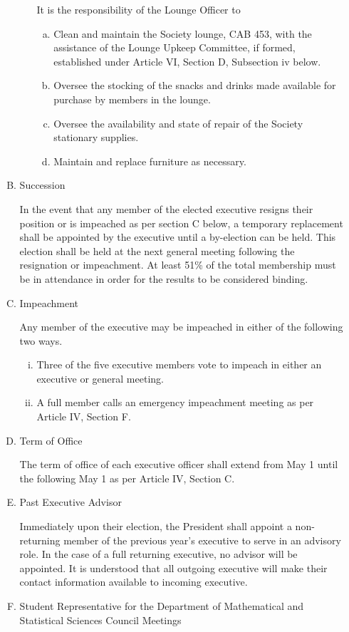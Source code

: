 \documentclass[11pt]{article}
\begin{document}
\begin{enumerate}[I.]
\begin{enumerate}[A)]
\begin{enumerate}[i)]
					It is the responsibility of the Lounge Officer to
						\begin{enumerate}[a)]
							\item Clean and maintain the Society lounge, CAB 453, with the assistance of the Lounge Upkeep Committee, if formed, established under Article VI, Section D, Subsection iv below. 
							\item Oversee the stocking of the snacks and drinks made available for purchase by members in the lounge.
							\item Oversee the availability and state of repair of the Society stationary supplies. 
							\item Maintain and replace furniture as necessary. 
						\end{enumerate}	
				\end{enumerate}
				\item Succession
				
				In the event that any member of the elected executive resigns their position or is impeached as per section C below, a temporary replacement shall be appointed by the executive until a by-election can be held. This election shall be held at the next general meeting following the resignation or impeachment. At least 51\% of the total membership must be in attendance in order for the results to be considered binding. 
				\item Impeachment
				
				Any member of the executive may be impeached in either of the following two ways.
					\begin{enumerate}[i)]
						\item Three of the five executive members vote to impeach in either an executive or general meeting.
						\item A full member calls an emergency impeachment meeting as per Article IV, Section F.
					\end{enumerate}
				\item Term of Office
				
				The term of office of each executive officer shall extend from May 1 until the following May 1 as per Article IV, Section C. 
				\item Past Executive Advisor
				
				Immediately upon their election, the President shall appoint a non-returning member of the previous year's executive to serve in an advisory role. In the case of a full returning executive, no advisor will be appointed. It is understood that all outgoing executive will make their contact information available to incoming executive.
				\item Student Representative for the Department of Mathematical and Statistical Sciences Council Meetings
				

\end{enumerate}
\end{enumerate}
\end{document}
